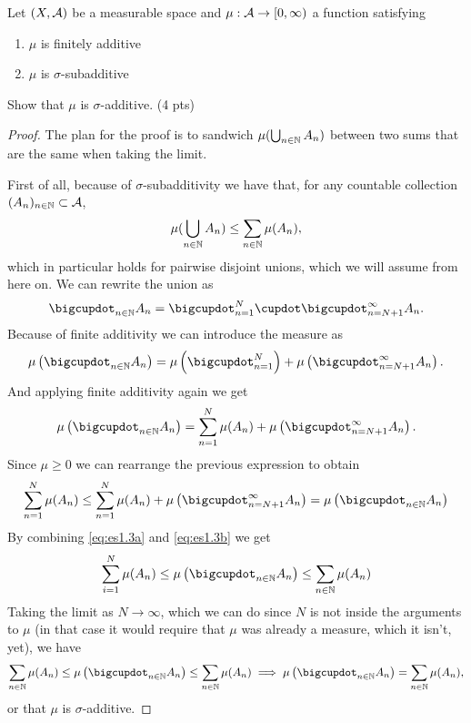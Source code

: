 \begin{ex}
	Let $(X, \mathcal{A})$ be a measurable space and $\mu : \mathcal{A} \to [0, \infty)$ a function satisfying
	\begin{enumerate}
		\item $\mu$ is finitely additive
		\item $\mu$ is $\sigma$-subadditive
	\end{enumerate}
	Show that $\mu$ is $\sigma$-additive. (4 pts)
\end{ex}

\begin{proof}
	The plan for the proof is to sandwich $\mu(\bigcup_{n\in\mathbb{N}} A_n)$ between two sums that are the same when taking the limit.
		
	First of all, because of $\sigma$-subadditivity we have that, for any countable collection $(A_n)_{n\in\mathbb{N}} \subset \mathcal{A}$,
	\begin{align}
		\label{eq:es1.3a}
		\mu(\bigcup_{n\in\mathbb{N}} A_n) \leq \sum_{n\in \mathbb{N}} \mu(A_n),
	\end{align}
	which in particular holds for pairwise disjoint unions, which we will assume from here on. We can rewrite the union as
	\begin{align*}
		\bigcupdot_{n\in \N} A_n = \bigcupdot_{n = 1}^N \cupdot \bigcupdot_{n = N+1}^\infty A_n.
	\end{align*}
	Because of finite additivity we can introduce the measure as
	\begin{align*}
		\mu\left(\bigcupdot_{n\in \N} A_n\right) = \mu\left(\bigcupdot_{n = 1}^N\right) + \mu\left(\bigcupdot_{n = N+1}^\infty A_n\right).
	\end{align*}
	And applying finite additivity again we get
	\begin{align*}
		\mu\left(\bigcupdot_{n\in \N} A_n\right) = \sum_{n = 1}^N \mu(A_n) + \mu\left(\bigcupdot_{n = N+1}^\infty A_n\right).
	\end{align*}
	Since $\mu \geq 0$ we can rearrange the previous expression to obtain
	\begin{align}
		\label{eq:es1.3b}
		\sum_{n = 1}^N \mu(A_n) \leq \sum_{n = 1}^N \mu(A_n) + \mu\left(\bigcupdot_{n = N+1}^\infty A_n\right) = 	\mu\left(\bigcupdot_{n\in \N} A_n\right)
	\end{align}
	By combining \ref{eq:es1.3a} and \ref{eq:es1.3b} we get
	\begin{align*}
		\sum_{i = 1}^N \mu(A_n) \leq \mu\left(\bigcupdot_{n\in \N} A_n\right) \leq \sum_{n \in \N} \mu(A_n)
	\end{align*}
	Taking the limit as $N \to \infty$, which we can do since $N$ is not inside the arguments to $\mu$ (in that case it would require that $\mu$ was already a measure, which it isn't, yet), we have
	\begin{align*}
		\sum_{n \in \N} \mu(A_n) \leq \mu\left(\bigcupdot_{n\in \N} A_n\right) \leq \sum_{n \in \N} \mu(A_n) \implies \mu\left(\bigcupdot_{n\in \N} A_n\right) = \sum_{n \in \N} \mu(A_n),
	\end{align*}
	or that $\mu$ is $\sigma$-additive.
\end{proof}


